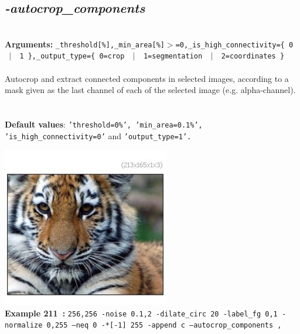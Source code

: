 \documentclass[a4paper,11pt,twoside]{book}
\begin{document}
\subsection{\emph{-autocrop\_components} }\vspace*{-0.5em}
~\\\textbf{Arguments: } 
{\small \texttt{\_threshold[\%],\_min\_area[\%]$>$=0,\_is\_high\_connectivity=\{ 0 ~$|$~ 1 \},\_output\_type=\{ 0=crop ~$|$~ 1=segmentation ~$|$~ 2=coordinates \}}}\\~\\
Autocrop and extract connected components in selected images, according to a mask given as the last channel of
each of the selected image (e.g. alpha-channel).
~\\~\\\textbf{Default values}: {\small \texttt{'threshold=0\%', 'min\_area=0.1\%', 'is\_high\_connectivity=0'} and \texttt{'output\_type=1'.}}
\begin{center}\includegraphics[keepaspectratio=true,height=7cm,width=\textwidth]{img/gmic_def211.jpg}\\
{\footnotesize \textbf{Example 211~:} \texttt{256,256 -noise 0.1,2 -dilate\_circ 20 -label\_fg 0,1 -normalize 0,255 --neq 0 -*[-1] 255 -append c --autocrop\_components ,}}
\end{center}
\end{document}
